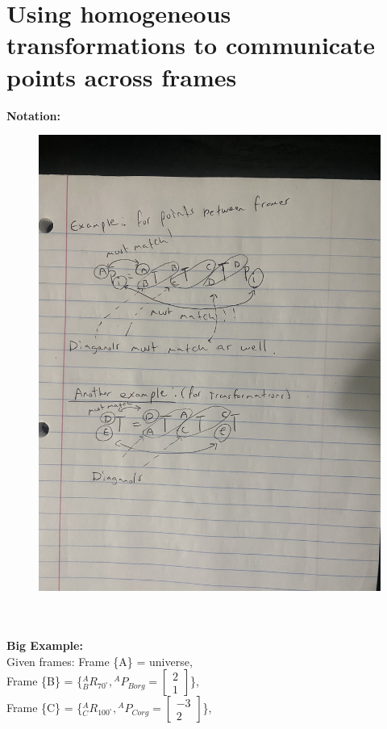 \documentclass{article}
\begin{document}
\newpage
\section{Using homogeneous transformations to communicate points across frames}
\textbf{Notation:}\\
\begin{figure}[htp]
    \centering
    \includegraphics[width=12cm, angle =270 ]{notation.jpeg}
    \caption{}
    \label{fig:pubsub}
\end{figure}\\\\
\newpage
\textbf{Big Example: }\\    
Given frames: Frame \{A\} = universe,\\ 
Frame \{B\} = \{${}^{A}_{B}R_{70^\circ} ,{}^{A}P_{Borg}=\begin{bmatrix}
2 \\
1 
\end{bmatrix} $\},\\
Frame \{C\} = \{${}^{A}_{C}R_{100^\circ} ,{}^{A}P_{Corg}=\begin{bmatrix}
-3  \\
2 
\end{bmatrix} $\},\\
\end{document}
